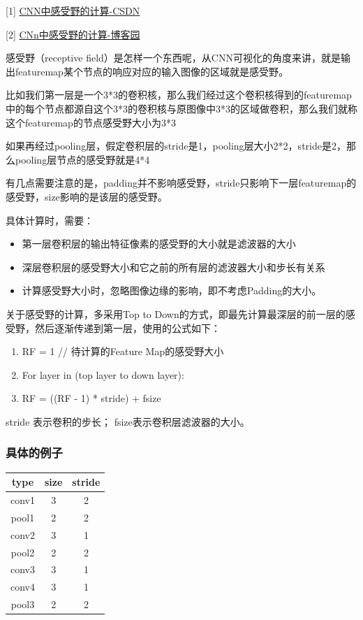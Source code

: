 [1] \href{https://blog.csdn.net/kuaitoukid/article/details/46829355}{CNN中感受野的计算-CSDN}

[2] \href{https://www.cnblogs.com/objectDetect/p/5947169.html}{CNn中感受野的计算-博客园}

感受野（receptive field）是怎样一个东西呢，从CNN可视化的角度来讲，就是输出featuremap某个节点的响应对应的输入图像的区域就是感受野。

比如我们第一层是一个3*3的卷积核，那么我们经过这个卷积核得到的featuremap中的每个节点都源自这个3*3的卷积核与原图像中3*3的区域做卷积，那么我们就称这个featuremap的节点感受野大小为3*3

如果再经过pooling层，假定卷积层的stride是1，pooling层大小2*2，stride是2，那么pooling层节点的感受野就是4*4

有几点需要注意的是，padding并不影响感受野，stride只影响下一层featuremap的感受野，size影响的是该层的感受野。

具体计算时，需要：
\begin{itemize}
\item 第一层卷积层的输出特征像素的感受野的大小就是滤波器的大小
\item 深层卷积层的感受野大小和它之前的所有层的滤波器大小和步长有关系
\item 计算感受野大小时，忽略图像边缘的影响，即不考虑Padding的大小。
\end{itemize}

关于感受野的计算，多采用Top to Down的方式，即最先计算最深层的前一层的感受野，然后逐渐传递到第一层，使用的公式如下：
\begin{enumerate}
\item RF = 1   // 待计算的Feature Map的感受野大小
\item For layer in (top layer to down layer):
\item      RF = ((RF - 1) * stride) + fsize
\end{enumerate}

stride 表示卷积的步长； fsize表示卷积层滤波器的大小。

\subsubsection{具体的例子}

\begin{tabular}{ccc}
\toprule
type & size & stride \\
\midrule
conv1 & 3 & 2 \\
pool1 & 2 & 2 \\
conv2 & 3 & 1 \\
pool2 & 2 & 2 \\
conv3 & 3 & 1 \\
conv4 & 3 & 1 \\
pool3 & 2 & 2 \\
\bottomrule
\end{tabular}

